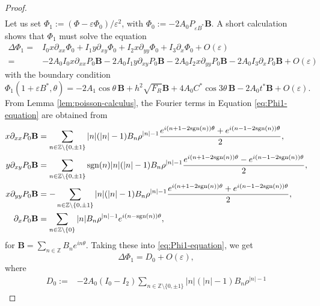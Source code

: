\documentclass[12pt,reqno]{amsart}
\numberwithin{equation}{section}
\theoremstyle{definition}
\theoremstyle{remark}
\begin{document}
\begin{proof}
\begin{align*}
\end{align*} 
Let us set  $ \Phi_1:=(\Phi-\varepsilon\Phi_0)/ \varepsilon^2 $, with $ \Phi_0:=-2A_0P_{\varepsilon B^*} \textbf{B}. $ A short calculation shows that $\Phi_1$ must solve the equation
 \begin{equation}\label{eq:Phi1-equation}
 \begin{split}
 \Delta\Phi_1=&I_0x\partial_{xx}\Phi_0+I_1y\partial_{xy}\Phi_0+I_2x\partial_{yy}\Phi_0+I_3\partial_x\Phi_0+O(\varepsilon)\\
=&-2A_0I_0x\partial_{xx}P_0\textbf{B}-2A_0I_1y\partial_{xy}P_0\textbf{B}-2A_0I_2x\partial_{yy}P_0\textbf{B}-2A_0I_3\partial_xP_0\textbf{B}+O(\varepsilon) 
 \end{split}
 \end{equation}
with the boundary condition  
 \begin{equation*} 
 \Phi_1(1+\varepsilon B^*,\theta)
 =-2A_1 \cos\theta\, \textbf{B}+h^2\sqrt{F_R} \textbf{B}+4 A_0C^*\cos3\theta\, \textbf{B}-2 A_0 t^*\textbf{B}+O(\varepsilon).
 \end{equation*}
From Lemma \ref{lem:poisson-calculus}, the Fourier   terms in  Equation \eqref{eq:Phi1-equation} are obtained from
 \begin{align*} 
 x\partial_{xx}P_0\textbf{B}
 &=\sum_{n\in\mathbb{Z}\setminus\{0,\pm1\}}|n|(|n|-1)B_n\rho^{|n|-1}
 \frac{e^{i(n+1-2\text{sgn}(n))\theta}+e^{i(n-1-2\text{sgn}(n))\theta}}{2},
\notag\\
 y\partial_{xy}P_0\textbf{B}
 &=\sum_{n\in\mathbb{Z}\setminus\{0,\pm1\}}\text{sgn}(n)|n|(|n|-1)B_n\rho^{|n|-1}
 \frac{e^{i(n+1-2\text{sgn}(n))\theta}-e^{i(n-1-2\text{sgn}(n))\theta}}{2},
\notag\\
 x\partial_{yy}P_0\textbf{B}
 &=-\sum_{n\in\mathbb{Z}\setminus\{0,\pm1\}}|n|(|n|-1)B_n\rho^{|n|-1}
 \frac{e^{i(n+1-2\text{sgn}(n))\theta}+e^{i(n-1-2\text{sgn}(n))\theta}}{2},
\notag\\
 \partial_xP_0\textbf{B}
 &=\sum_{n\in\mathbb{Z}\setminus\{0\}}|n|B_n\rho^{|n|-1}e^{i(n-\text{sgn}(n))\theta},
\notag
 \end{align*}
for $ \textbf{B}=\sum_{n\in\mathbb Z}B_ne^{in\theta} $.  Taking these into \eqref{eq:Phi1-equation}, we get
\begin{equation*} 
 \Delta\Phi_1=D_0+O(\varepsilon), 
\end{equation*}
where 
\begin{equation*} 
\begin{split}
D_0:=&-2A_0(I_0-I_2)\sum_{n\in\mathbb{Z}\setminus\{0,\pm1\}}|n|(|n|-1)B_n\rho^{|n|-1}

\end{split}
\end{equation*}
\end{proof}
\end{document}
